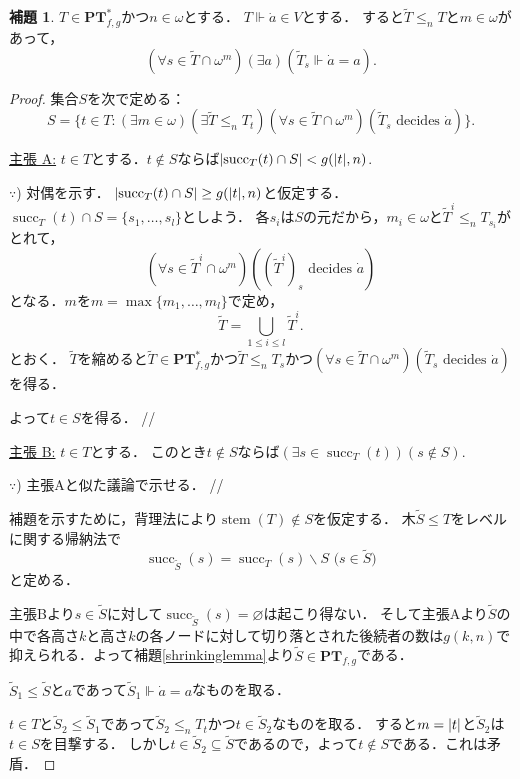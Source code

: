 \documentclass[uplatex]{jsarticle}
\newcommand\forces{\Vdash}
\newcommand{\stem}{\operatorname{stem}}
\newcommand{\suc}{\operatorname{succ}}
\newcommand{\PTfg}{\mathbf{PT}_{f,g}}
\DeclarePairedDelimiter\abs{\lvert}{\rvert}
\renewcommand\emptyset{\varnothing}
\renewcommand\subset{\subseteq}
\renewcommand{\setminus}{\smallsetminus}
\theoremstyle{definition}
\newtheorem{lem}[thm]{補題}
\newenvironment{claim}[1]{\par\noindent\underline{主張 #1:}\space}{}
\newenvironment{claimproof}[1]{\par\noindent$\because$) \space#1}{\hfill //}
\begin{document}
	\begin{lem}\label{ptfg-strong-axiom-a}
		$T \in \PTfg^*$かつ$n \in \omega$とする．
		$T \forces \dot{a} \in V$とする．
		すると$\tilde{T} \le_n T$と$m \in \omega$があって，
		\[
		(\forall s \in \tilde{T} \cap \omega^m) (\exists a) (\tilde{T}_s \forces \dot{a} = a).
		\]
	\end{lem}
	\begin{proof}
		集合$S$を次で定める：
		\[
		S = \{ t \in T : (\exists m \in \omega)(\exists \tilde{T} \le_n T_t)(\forall s \in \tilde{T} \cap \omega^m)(\tilde{T}_s \text{ decides } \dot{a}) \}.
		\]
		\begin{claim}{A}
			$t \in T$とする．$t \not \in S$ならば$\abs{\suc_T(t) \cap S} < g(\abs{t}, n)$.
		\end{claim}
		\begin{claimproof}
			対偶を示す．
			$\abs{\suc_T(t) \cap S} \ge g(\abs{t}, n)$と仮定する．
			$\suc_T(t) \cap S = \{s_1, \dots, s_l\}$としよう．
			各$s_i$は$S$の元だから，$m_i \in \omega$と$\tilde{T}^i \le_n T_{s_i}$がとれて，
			\[
			(\forall s \in \tilde{T}^i \cap \omega^m)((\tilde{T}^i)_s \text{ decides } \dot{a})
			\]
			となる．$m$を$m = \max \{ m_1, \dots, m_l \}$で定め，
			\[
			\tilde{T} = \bigcup_{1 \le i \le l} \tilde{T}^i.
			\]
			とおく．
			$\tilde{T}$を縮めると$\tilde{T} \in \PTfg^*$かつ$\tilde{T} \le_n T_s$かつ$(\forall s \in \tilde{T} \cap \omega^m)(\tilde{T}_s \text{ decides } \dot{a})$を得る．
			
			よって$t \in S$を得る．
		\end{claimproof}
	
		\begin{claim}{B}
			$t \in T$とする．
			このとき$t \not \in S$ならば$(\exists s \in \suc_T(t)) (s \not \in S)$.
		\end{claim}
		\begin{claimproof}
			主張Aと似た議論で示せる．
		\end{claimproof}
	
		補題を示すために，背理法により$\stem(T) \not \in S$を仮定する．
		木$\tilde{S} \le T$をレベルに関する帰納法で
		\[
		\suc_{\tilde{S}}(s) = \suc_T(s) \setminus S \text{ ($s \in \tilde{S}$)}
		\]
		と定める．
		
		主張Bより$s \in \tilde{S}$に対して$\suc_{\tilde{S}}(s) = \emptyset$は起こり得ない．
		そして主張Aより$\tilde{S}$の中で各高さ$k$と高さ$k$の各ノードに対して切り落とされた後続者の数は$g(k, n)$で抑えられる．よって補題\ref{shrinkinglemma}より$\tilde{S} \in \PTfg$である．
		
		$\tilde{S}_1 \le \tilde{S}$と$a$であって$\tilde{S}_1 \forces \dot{a} = a$なものを取る．
		
		$t \in T$と$\tilde{S}_2 \le \tilde{S}_1$であって$\tilde{S}_2 \le_n T_t$かつ$t \in \tilde{S}_2$なものを取る．
		すると$m =\abs{t}$と$\tilde{S}_2$は$t \in S$を目撃する．
		しかし$t \in \tilde{S}_2 \subset \tilde{S}$であるので，よって$t \not \in S$である．これは矛盾．
	\end{proof}
	
\end{document}
